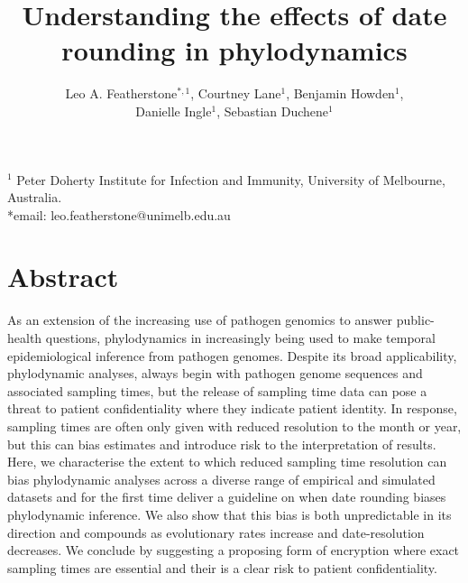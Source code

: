 \documentclass{article}
\title{Understanding the effects of date rounding in phylodynamics}
\author{Leo A. Featherstone$^{\ast,1}$, Courtney Lane$^{1}$, Benjamin Howden$^{1}$,\\Danielle Ingle$^{1}$, Sebastian Duchene$^{1}$}
\begin{document}
\maketitle
\linenumbers
$^{1}$ Peter Doherty Institute for Infection and Immunity, University of Melbourne, Australia.\\
*email: leo.featherstone@unimelb.edu.au

\section*{Abstract}
As an extension of the increasing use of pathogen genomics to answer public-health questions, phylodynamics in increasingly being used to make  temporal epidemiological inference from pathogen genomes. Despite its broad applicability, phylodynamic analyses, always begin with pathogen genome sequences and associated sampling times, but the release of sampling time data can pose a threat to patient confidentiality where they indicate patient identity. In response, sampling times are often only given with reduced resolution to the month or year, but this can bias estimates and introduce risk to the interpretation of results. Here, we characterise the extent to which reduced sampling time resolution can bias phylodynamic analyses across a diverse range of empirical and simulated datasets and for the first time deliver a guideline on when date rounding biases phylodynamic inference. We also show that this bias is both unpredictable in its direction and compounds as evolutionary rates increase and date-resolution decreases. We conclude by suggesting a proposing form of encryption where exact sampling times are essential and their is a clear risk to patient confidentiality.
\end{document}
